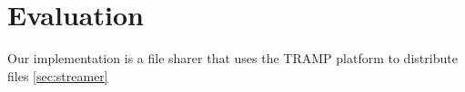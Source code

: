 \section{Evaluation}
\label{sec:eval}

Our implementation is a file sharer that uses the TRAMP platform to distribute files \ref{sec:streamer}